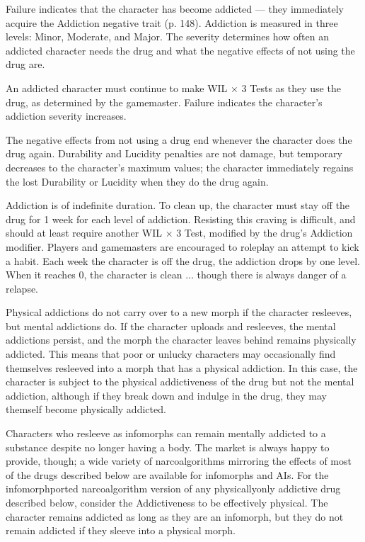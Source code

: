 Failure indicates that the character has become addicted --- they immediately acquire the Addiction negative trait (p. 148). Addiction is measured in three levels: Minor, Moderate, and Major. The severity determines how often an addicted character needs the drug and what the negative effects of not using the drug are.

An addicted character must continue to make WIL $\times$ 3 Tests as they use the drug, as determined by the gamemaster. Failure indicates the character’s addiction severity increases.

The negative effects from not using a drug end whenever the character does the drug again. Durability and Lucidity penalties are not damage, but temporary decreases to the character’s maximum values; the character immediately regains the lost Durability or Lucidity when they do the drug again.

Addiction is of indefinite duration. To clean up, the character must stay off the drug for 1 week for each level of addiction. Resisting this craving is difficult, and should at least require another WIL $\times$ 3 Test, modified by the drug’s Addiction modifier. Players and gamemasters are encouraged to roleplay an attempt to kick a habit. Each week the character is off the drug, the addiction drops by one level. When it reaches 0, the character is clean ... though there is always danger of a relapse.

Physical addictions do not carry over to a new morph if the character resleeves, but mental addictions do. If the character uploads and resleeves, the mental addictions persist, and the morph the character leaves behind remains physically addicted. This means that poor or unlucky characters may occasionally find themselves resleeved into a morph that has a physical addiction. In this case, the character is subject to the physical addictiveness of the drug but not the mental addiction, although if they break down and indulge in the drug, they may themself become physically addicted.

Characters who resleeve as infomorphs can remain mentally addicted to a substance despite no longer having a body. The market is always happy to provide, though; a wide variety of narcoalgorithms mirroring the effects of most of the drugs described below are available for infomorphs and AIs. For the infomorphported narcoalgorithm version of any physicallyonly addictive drug described below, consider the Addictiveness to be effectively physical. The character remains addicted as long as they are an infomorph, but they do not remain addicted if they sleeve into a physical morph.

